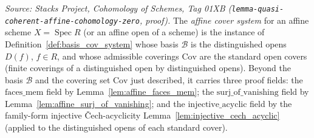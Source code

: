 \begin{definition}


  \label{def:affine_cover_system}
  \textit{Source: Stacks Project, Cohomology of Schemes, Tag 01XB
  (\texttt{lemma-quasi-coherent-affine-cohomology-zero}, proof).}
  The \emph{affine cover system} for an affine scheme \(X = \operatorname{Spec} R\) (or an affine open
  of a scheme) is the instance of Definition~\ref{def:basis_cov_system} whose basis \(\mathcal{B}\) is
  the distinguished opens \(D(f)\), \(f \in R\), and whose admissible coverings \(\mathrm{Cov}\) are
  the standard open covers (finite coverings of a distinguished open by distinguished opens). Beyond
  the basis \(\mathcal{B}\) and the covering set \(\mathrm{Cov}\) just described, it carries three
  proof fields: the \(\mathrm{faces\_mem}\) field by Lemma~\ref{lem:affine_faces_mem}; the
  \(\mathrm{surj\_of\_vanishing}\) field by Lemma~\ref{lem:affine_surj_of_vanishing}; and the
  \(\mathrm{injective\_acyclic}\) field by the family-form injective {\v C}ech-acyclicity
  Lemma~\ref{lem:injective_cech_acyclic} (applied to the distinguished opens of each standard cover).
\end{definition}

